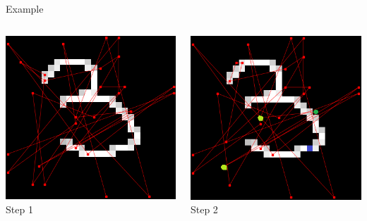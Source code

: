 \documentclass{beamer}
\begin{document}
	\begin{frame}{Example}
  
		\begin{columns}
    
			\begin{column}{0.33\textwidth}
      
				\centering
				\includegraphics[width=1\textwidth]{pics/algo_1_1.png}
Step 1
    			\end{column}

    				
			\begin{column}{0.33\textwidth}
      
				\centering
				\includegraphics[width=1\textwidth]{pics/algo_1_2.png}
Step 2
    			\end{column}


\end{columns}
\end{frame}
\end{document}
